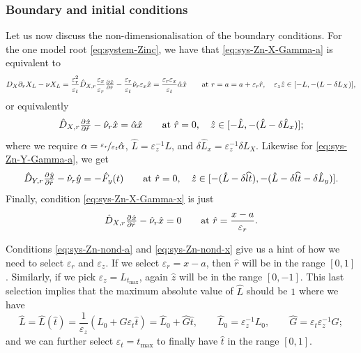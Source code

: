 \documentclass[11pt]{article}
\numberwithin{equation}{section}
\begin{document}
\subsubsection{Boundary and initial conditions}

Let us now discuss the non-dimensionalisation of the boundary conditions. For the one model root \eqref{eq:system-Zinc}, we have that \eqref{eq:sys-Zn-X-Gamma-a} is equivalent to
\[
    D_X \partial_r X_L - \nu X_L = 
    \frac{\varepsilon_r^2}{\varepsilon_t} \hat{D}_{X,r} \frac{\varepsilon_x}{\varepsilon_r} \pd{\hat{x}}{\hat{r}} - \frac{\varepsilon_r}{\varepsilon_t} \hat{\nu}_r \varepsilon_x \hat{x} = \frac{\varepsilon_r \varepsilon_x}{\varepsilon_t} \hat{\alpha} \hat{x}
    \qquad \text{at } r = a = a + \varepsilon_r \hat{r},\quad \varepsilon_z \hat{z} \in [-L, -(L - \delta L_X)],
\]
or equivalently
\begin{equation}
    \label{eq:sys-Zn-nond-a}
    \hat{D}_{X,r} \pd{\hat{x}}{\hat{r}} - \hat{\nu}_r \hat{x} = \hat{\alpha} \hat{x}
    \qquad \text{at } \hat{r} = 0, \quad \hat{z} \in [-\hat{L}, -(\hat{L} - \delta \hat{L}_x)];
\end{equation}
where we require \( \alpha = \nicefrac{\varepsilon_r}{\varepsilon_t} \hat{\alpha}\), \( \hat{L} = \varepsilon_z^{-1} L\), and \( \delta\hat{L}_x = \varepsilon_z^{-1} \delta L_X\). Likewise for \eqref{eq:sys-Zn-Y-Gamma-a}, we get %
\begin{equation}
    \label{eq:sys-Zn-nond-b}
    \hat{D}_{Y,r} \pd{\hat{y}}{\hat{r}}  - \hat{\nu}_r \hat{y} = -\hat{F}_y(t)     \qquad\text{at } \hat{r} = 0, \quad \hat{z} \in [-(\hat{L} - \delta \widehat{lt}), -(\hat{L} - \delta \widehat{lt} - \delta \hat{L}_y)].
\end{equation}
Finally, condition \eqref{eq:sys-Zn-X-Gamma-x} is just
\begin{equation}
    \label{eq:sys-Zn-nond-x}
    \hat{D}_{X,r} \pd{\hat{x}}{\hat{r}} - \hat{\nu}_r \hat{x} = 0
    \qquad \text{at } \hat{r} = \frac{x-a}{\varepsilon_r}.
\end{equation}

Conditions \eqref{eq:sys-Zn-nond-a} and \eqref{eq:sys-Zn-nond-x} give us a hint of how we need to select \(\varepsilon_r\) and \(\varepsilon_z\). If we select \( \varepsilon_r = x-a\), then \( \hat{r} \) will be in the range \( [0,1]\). Similarly, if we pick \( \varepsilon_z = L_{t_{\max}}\), again \(\hat z \) will be in the range \([0,-1]\). This last selection implies that the maximum absolute value of \( \hat{L}\) should be \(1\) where we have
\[
    \hat{L} = \hat{L}(\hat t) = \frac{1}{\varepsilon_z} ( L_0 + G \varepsilon_t \hat t )
    = \hat{L}_0 + \hat{G} \hat t,
    \qquad 
    \hat{L}_0 = \varepsilon^{-1}_z L_0,
    \qquad
    \hat{G} = \varepsilon_t \varepsilon_z^{-1} G;
\]
and we can further select \( \varepsilon_t = t_{\max}\) to finally have \( \hat t\) in the range \( [0,1]\). 
\end{document}

